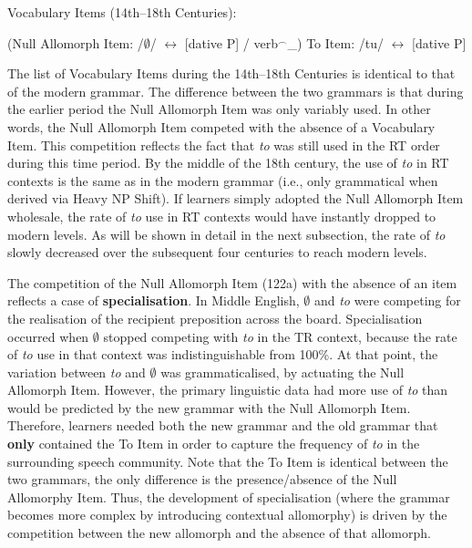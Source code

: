 	\begin{exe}
		\ex Vocabulary Items (14th--18th Centuries):
		\begin{xlist}
			\ex (Null Allomorph Item: /$\emptyset$/ $\leftrightarrow$ [dative P] / verb$^{\smallfrown}$\_)
			\ex To Item: /tu/ $\leftrightarrow$ [dative P]
		\end{xlist}
	\end{exe}

	The list of Vocabulary Items during the 14th--18th Centuries is identical to that of the modern grammar. The difference between the two grammars is that during the earlier period the Null Allomorph Item was only variably used. In other words, the Null Allomorph Item competed with the absence of a Vocabulary Item. This competition reflects the fact that \textit{to} was still used in the RT order during this time period. By the middle of the 18th century, the use of \textit{to} in RT contexts is the same as in the modern grammar (i.e., only grammatical when derived via Heavy NP Shift). If learners simply adopted the Null Allomorph Item wholesale, the rate of \textit{to} use in RT contexts would have instantly dropped to modern levels. As will be shown in detail in the next subsection, the rate of \textit{to} slowly decreased over the subsequent four centuries to reach modern levels.
	
	The competition of the Null Allomorph Item (122a) with the absence of an item reflects a case of \textbf{specialisation}. In Middle English, $\emptyset$ and \textit{to} were competing for the realisation of the recipient preposition across the board. Specialisation occurred when $\emptyset$ stopped competing with \textit{to} in the TR context, because the rate of \textit{to} use in that context was indistinguishable from 100\%. At that point, the variation between \textit{to} and $\emptyset$ was grammaticalised, by actuating the Null Allomorph Item. However, the primary linguistic data had more use of \textit{to} than would be predicted by the new grammar with the Null Allomorph Item. Therefore, learners needed both the new grammar and the old grammar that \textbf{only} contained the To Item in order to capture the frequency of \textit{to} in the surrounding speech community. Note that the To Item is identical between the two grammars, the only difference is the presence/absence of the Null Allomorphy Item. Thus, the development of specialisation (where the grammar becomes more complex by introducing contextual allomorphy) is driven by the competition between the new allomorph and the absence of that allomorph.

